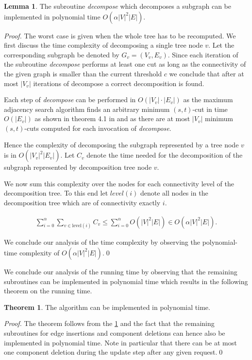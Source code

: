 \documentclass[a4paper, 10pt]{article}
\newcommand{\nl}{\newline}
\newcommand{\adjDel}{\text{C{\scriptsize REP}-A{\scriptsize DJ}}}
\theoremstyle{definition}
\newtheorem{theo}[defi]{Theorem}
\newtheorem{lemma}[defi]{Lemma}
\begin{document}
\begin{lemma}
	\label{dec_run_time_lem}
	The subroutine \textit{decompose} which decomposes a subgraph can be implemented in polynomial time $O(\alpha|V|^2|E|)$.
\end{lemma}

\textit{Proof.} The worst case is given when the whole tree has to be recomputed. We first discuss the time complexity of decomposing a single tree node $v$. Let the corresponding subgraph be denoted by $G_v=(V_v, E_v)$.
Since each iteration of the subroutine \textit{decompose} performs at least one cut as long as the connectivity of the given graph is smaller than the current threshold $c$ we conclude that after at most $|V_v|$ iterations of decompose a correct decomposition is found. 

Each step of \textit{decompose} can be performed in $O(|V_v|\cdot|E_v|)$ as the maximum adjacency search algorithm finds an arbitrary minimum $(s,t)$-cut in time $O(|E_v|)$ as shown in theorem 4.1 in \cite{Chang2013} and as there are at most $|V_v|$ minimum $(s,t)$-cuts computed for each invocation of \textit{decompose}.

Hence the complexity of decomposing the subgraph represented by a tree node $v$ is in $O(|V_v|^2|E_v|)$. Let $C_v$ denote the time needed for the decomposition of the subgraph represented  by decomposition tree node $v$.

We now sum this complexity over the nodes for each connectivity level of the decomposition tree. To this end let $level(i)$ denote all nodes in the decomposition tree which are of connectivity exactly $i$.

\begin{align*}
	\sum_{i=0}^{\alpha}\sum_{v\in \text{level}(i)}C_v\leq\sum_{i=0}^{\alpha}O(|V|^2|E|)\in O(\alpha|V|^2|E|).
\end{align*}

We conclude our analysis of the time complexity by observing the polynomial-time complexity of $O(\alpha|V|^2|E|)$.\qed\nl

We conclude our analysis of the running time by observing that the remaining subroutines can be implemented in polynomial time which results in the following theorem on the running time.

\begin{theo}
	\label{run_time_theo}
	The algorithm \adjDel{} can be implemented in polynomial time.
\end{theo}

\textit{Proof.} The theorem follows from the \cref{dec_run_time_lem} and the fact that the remaining subroutines for edge insertions and component deletions can hence also be implemented in polynomial time. Note in particular that there can be at most one component deletion during the update step after any given request.\qed
\end{document}
